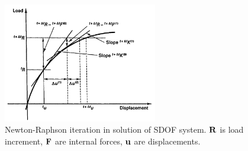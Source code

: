 \begin{figure}[ht]
    \centering
    \includegraphics[width=0.60\textwidth]{img/full_newton_raphson.png}
    \caption{Newton-Raphson iteration in solution of SDOF system.
    $ \mathbf{R} $ is load increment, $ \mathbf{F} $ are internal forces,
    $ \mathbf{u} $ are displacements.}
    \label{fig:full-newton-raphson-png}
\end{figure}



